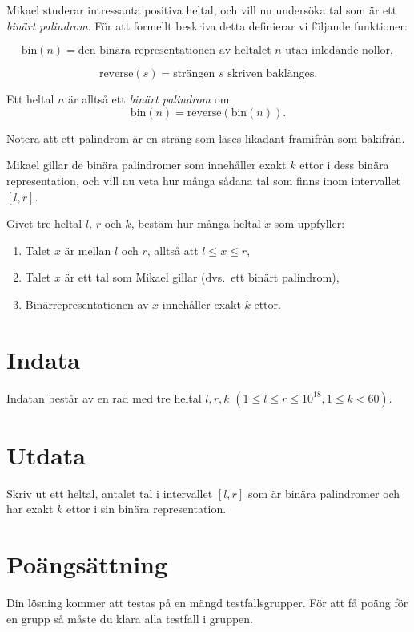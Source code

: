 \noindent

Mikael studerar intressanta positiva heltal, och vill nu undersöka tal som är ett \emph{binärt palindrom}. 
För att formellt beskriva detta definierar vi följande funktioner:

\[
\text{bin}(n) = \text{den binära representationen av heltalet } n \text{ utan inledande nollor},
\]

\[
\text{reverse}(s) = \text{strängen } s \text{ skriven baklänges}.
\]

Ett heltal $n$ är alltså ett \emph{binärt palindrom} om
\[
\text{bin}(n) = \text{reverse}(\text{bin}(n)).
\]

Notera att ett palindrom är en sträng som läses likadant framifrån som bakifrån.


Mikael gillar de binära palindromer som innehåller exakt $k$ ettor i dess binära representation, 
och vill nu veta hur många sådana tal som finns inom intervallet $[l,r]$.

Givet tre heltal $l$, $r$ och $k$, bestäm hur många heltal $x$ som uppfyller:
\begin{enumerate}
    \item Talet $x$ är mellan $l$ och $r$, alltså att $l \leq x \leq r$,
    \item Talet $x$ är ett tal som Mikael gillar (dvs.\ ett binärt palindrom),
    \item Binärrepresentationen av $x$ innehåller exakt $k$ ettor.
\end{enumerate}



\section*{Indata}
Indatan består av en rad med tre heltal $l, r, k$ $(1 \leq l \leq r \leq 10^{18}, 1 \leq k < 60)$.

\section*{Utdata}
Skriv ut ett heltal, antalet tal i intervallet $[l, r]$ som är binära palindromer och har exakt $k$ ettor i sin binära representation.


\section*{Poängsättning}
Din lösning kommer att testas på en mängd testfallsgrupper.
För att få poäng för en grupp så måste du klara alla testfall i gruppen.

